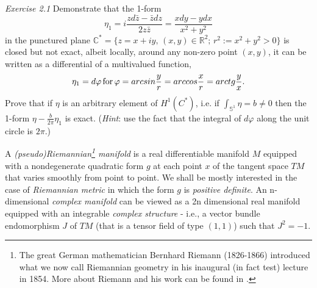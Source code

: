 {\it Exercise 2.1} Demonstrate that the 1-form
\begin{equation}
\label{H1}
\eta_1 = i\frac{zd{\bar z} - {\bar z}dz}{2z{\bar z}} = \frac{xdy - ydx}{x^2 + 
y^2}
\end{equation}
in the punctured plane ${\mathbb C}^* = \{z=x+iy, \, (x,y)\in{\mathbb R}^2; \,
r^2:= x^2 + y^2 > 0\}$ is closed but not exact, albeit locally, around any non-zero
point $(x, y)$, it can be written as a differential of a multivalued function,
\begin{equation}
\label{dphi}
\eta_1 = d\varphi \, {\rm for} \, \varphi = arcsin\frac{y}{r}
= arccos\frac{x}{r} = arctg\frac{y}{x}.
\end{equation}
Prove that if $\eta$ is an arbitrary element of $H^1(C^*)$, i.e. if $\int_{{\mathbb S}^1}
\eta = b\neq 0$ then the 1-form $\eta - \frac{b}{2\pi} \eta_1$ is exact.
({\it Hint}: use the fact that the integral of $d\varphi$ along the unit circle is $2\pi$.)

A {\it (pseudo)Riemannian\footnote{The great German mathematician Bernhard Riemann (1826-1866) 
introduced what we now call Riemannian geometry in his inaugural (in fact test) lecture 
in 1854. More about Riemann and his work can be found in \cite{Mo}.} manifold} is a real
differentiable manifold $M$ equipped with a nondegenerate quadratic form $g$ at each point 
$x$ of the tangent space $TM$ that varies smoothly from point to point. We shall be mostly 
interested in the case of {\it Riemannian metric} in which the form $g$ is {\it positive 
definite}. An n-dimensional {\it complex manifold} can be viewed as a 2n dimensional real
manifold equipped with an integrable {\it complex structure} - i.e., a vector bundle  
endomorphism $J$ of $TM$ (that is a tensor field of type $(1, 1)$) such that $J^2 = -1$.

